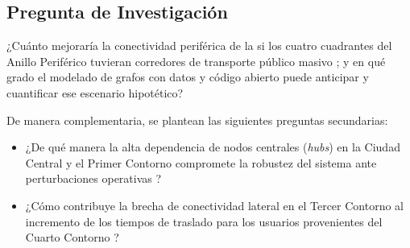 \subsection{Pregunta de Investigación}
\label{subsec:pregunta}

¿Cuánto mejoraría la conectividad periférica de la \zmvm{} si los cuatro
cuadrantes del Anillo Periférico tuvieran corredores de transporte
público masivo  ; y en qué grado el modelado de
grafos con datos \gtfs{} y código abierto puede anticipar y cuantificar ese
escenario hipotético?


De manera complementaria, se plantean las siguientes preguntas secundarias:

\begin{itemize}
    \item ¿De qué manera la alta dependencia de nodos centrales (\textit{hubs})
    en la Ciudad Central y el Primer Contorno compromete la robustez del
    sistema ante perturbaciones operativas ?

    \item ¿Cómo contribuye la brecha de conectividad lateral en el Tercer
    Contorno al incremento de los tiempos de traslado para los usuarios
    provenientes del Cuarto Contorno ?

\end{itemize}

